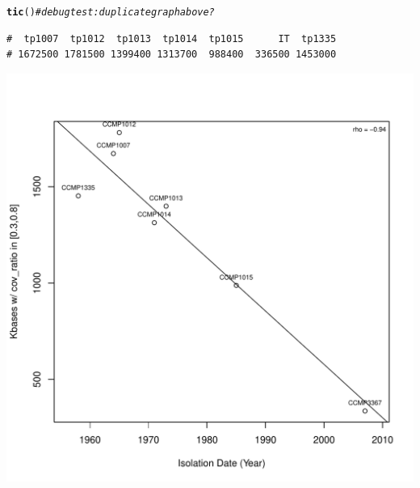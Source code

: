 \documentclass{article}\usepackage[]{graphicx}\usepackage[]{color}
\makeatletter
\def\maxwidth{ %
  \ifdim\Gin@nat@width>\linewidth
    \linewidth
  \else
    \Gin@nat@width
  \fi
}
\newcommand{\hlcom}[1]{\textcolor[rgb]{0.678,0.584,0.686}{\textit{#1}}}%
\newcommand{\hlstd}[1]{\textcolor[rgb]{0.345,0.345,0.345}{#1}}%
\newcommand{\hlkwd}[1]{\textcolor[rgb]{0.737,0.353,0.396}{\textbf{#1}}}%
\newenvironment{kframe}{%
 \def\at@end@of@kframe{}%
 \ifinner\ifhmode%
  \def\at@end@of@kframe{\end{minipage}}%
  \begin{minipage}{\columnwidth}%
 \fi\fi%
 \def\FrameCommand##1{\hskip\@totalleftmargin \hskip-\fboxsep
 \colorbox{shadecolor}{##1}\hskip-\fboxsep
     \hskip-\linewidth \hskip-\@totalleftmargin \hskip\columnwidth}%
 \MakeFramed {\advance\hsize-\width
   \@totalleftmargin\z@ \linewidth\hsize
   \@setminipage}}%
 {\par\unskip\endMakeFramed%
 \at@end@of@kframe}
\newenvironment{knitrout}{}{} %
\makeatother
\begin{document}
\begin{knitrout}\footnotesize
{}\color{fgcolor}\begin{kframe}
\begin{alltt}
\hlkwd{tic}\hlstd{()} \hlcom{# debug test: duplicate graph above?}
\end{alltt}
\begin{verbatim}
#  tp1007  tp1012  tp1013  tp1014  tp1015      IT  tp1335 
# 1672500 1781500 1399400 1313700  988400  336500 1453000
\end{verbatim}
\end{kframe}

{\centering \includegraphics[width=\maxwidth]{figs-knitr/unnamed-chunk-16-1} 

}



\end{knitrout}
\end{document}
